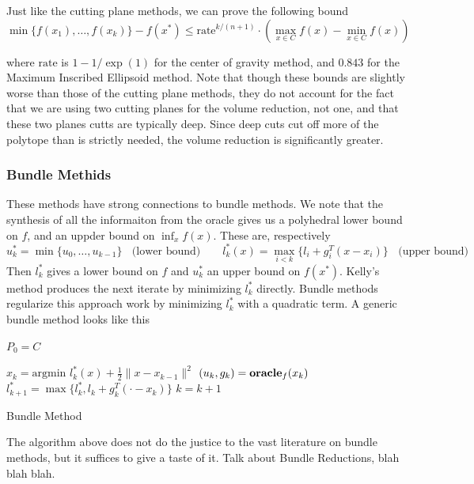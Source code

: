 Just like the cutting plane methods, we can prove the following bound
$$
\min\{f(x_{1}),\dots,f(x_{k})\}-f(x^{*})\leq \mbox{rate}^{k/(n+1)}\cdot\left(\max_{x\in C}f(x)-\min_{x\in C}f(x)\right)
$$

where $\mbox{rate}$ is $1 - 1/\exp(1)$ for the center of gravity method, and
$0.843$ for the Maximum Inscribed Ellipsoid method. Note that though these
bounds are slightly worse than those of the cutting plane methods, they
do not account for the fact that we are using two cutting planes for the 
volume reduction, not one, and that these two planes cutts are typically deep.
Since deep cuts cut off more of the polytope than is strictly needed, the 
volume reduction is significantly greater.

\subsubsection{Bundle Methids}
These methods have strong connections to bundle methods. We note that the
synthesis of all the informaiton from the oracle gives us a polyhedral lower bound
on $f$, and an uppder bound on $\inf_x f(x)$. These are, respectively
$$
u^*_k = \min{ \{ u_0, \dots, u_{k-1}\} } \;\; \mbox{ (lower bound)} \qquad 
l^*_k(x) = \max_{i < k}\{l_i + g_i^T(x-x_i)\} \;\; \mbox{ (upper bound)}
$$Then $l^*_k$ gives a lower bound on $f$ and $u_k^*$ an upper bound on $f(x^*)$. Kelly's method \cite{kelley1960cutting} produces the next iterate by minimizing $l^*_k$ directly. Bundle methods \cite{lemarechal1975extension,wolfe1975method} regularize this approach work by minimizing $l_k^*$ with a quadratic term. A generic bundle method looks like this

\begin{algorithm} 
  \SetAlgoNoLine
  \DontPrintSemicolon
  $P_0 = C$\;
  
   {
  \nl $x_{k}  = \mbox{argmin } l_k^*(x) + \tfrac{1}{2}\|x - x_{k-1}\|^2$\;
  \nl $(u_{k},g_{k})  = \mbox{\bf oracle}_f(x_{k})$\;
  \nl $l^*_{k+1}  = \max\{l^*_k, l_k + g_k^T(\cdot-x_k)\}$\;
  \nl $k = k + 1$
  }
  \caption{Bundle Method \label{alg:bundle}}
\end{algorithm}

The algorithm above does not do the justice to the vast literature on bundle methods,
but it suffices to give a taste of it. Talk about Bundle Reductions, blah blah blah.

